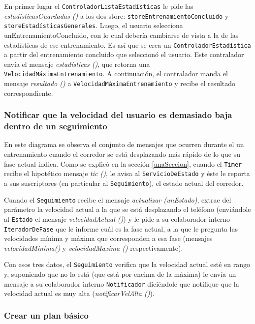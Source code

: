 En primer lugar el \texttt{ControladorListaEstadísticas} le pide las \emph{estadísticasGuardadas ()} a los dos store: \texttt{storeEntrenamientoConcluido} y \texttt{storeEstadísticasGenerales}. Luego, el usuario selecciona {unEntrenamientoConcluido}, con lo cual debería cambiarse de vista a la de las estadísticas de ese entrenamiento. Es así que se crea un \texttt{ControladorEstadística} a partir del entrenamiento concluido que seleccionó el usuario. Este contralador envía el mensaje \emph{estadísticas ()}, que retorna una \texttt{VelocidadMáximaEntrenamiento}. A continuación, el contralador manda el mensaje \emph{resultado ()} a \texttt{VelocidadMáximaEntrenamiento} y recibe el resultado correspondiente. 

\subsubsection{Notificar que la velocidad del usuario es demasiado baja dentro de un seguimiento}

En este diagrama se observa el conjunto de mensajes que ocurren durante el un entrenamiento cuando el corredor se está desplazando más rápido de lo que su fase actual indica. Como se explicó en la sección \ref{unaSeccion}, cuando el \texttt{Timer} recibe el hipotético mensaje \emph{tic ()}, le avisa al \texttt{ServicioDeEstado} y éste le reporta a sus suscriptores (en particular al \texttt{Seguimiento}), el estado actual del corredor.

Cuando el \texttt{Seguimiento} recibe el mensaje \emph{actualizar (unEstado)}, extrae del parámetro la velocidad actual a la que se está desplazando el teléfono (enviándole al \texttt{Estado} el mensaje \emph{velocidadActual ()}) y le pide a su colaborador interno \texttt{IteradorDeFase} que le informe cuál es la fase actual, a la que le pregunta las velocidades mínima y máxima que corresponden a esa fase (mensajes \emph{velocidadMinima()} y \emph{velocidadMaxima ()} respectivamente).

Con esos tres datos, el \texttt{Seguimiento} verifica que la velocidad actual esté en rango y, suponiendo que no lo está (que está por encima de la máxima) le envía un mensaje a su colaborador interno \texttt{Notificador} diciéndole que notifique que la velocidad actual es muy alta (\emph{notificarVelAlta ()}). 

\subsubsection{Crear un plan básico}

